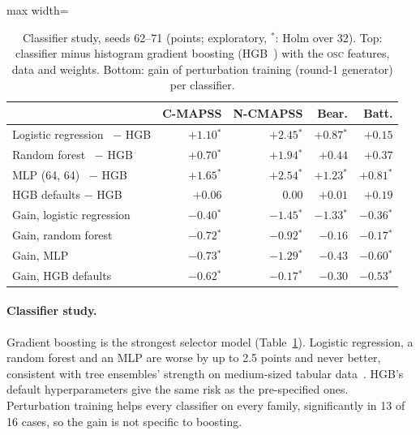 \documentclass{esannV2}
\newcommand{\OSC}{\textsc{osc}}
\newcommand{\s}{$^{\ast}$}
\begin{document}
\begin{table}[!htbp]
\caption{Classifier study, seeds 62--71 (points; exploratory, \s: Holm over 32). Top: classifier minus histogram gradient boosting (HGB~\cite{ke2017lightgbm,pedregosa2011scikit}) with the \OSC{} features, data and weights. Bottom: gain of perturbation training (round-1 generator) per classifier.}
\label{tab:clf}
\centering\footnotesize
\begin{adjustbox}{max width=\textwidth}\begin{tabular}{lrrrr}
\toprule
 & C-MAPSS & N-CMAPSS & Bear. & Batt.\\
\midrule
Logistic regression~\cite{cox1958regression} $-$ HGB & $+1.10$\s & $+2.45$\s & $+0.87$\s & $+0.15$\\
Random forest~\cite{breiman2001random} $-$ HGB & $+0.70$\s & $+1.94$\s & $+0.44$ & $+0.37$\\
MLP (64, 64)~\cite{rumelhart1986learning} $-$ HGB & $+1.65$\s & $+2.54$\s & $+1.23$\s & $+0.81$\s\\
HGB defaults $-$ HGB & $+0.06$ & $0.00$ & $+0.01$ & $+0.19$\\
\midrule
Gain, logistic regression~\cite{cox1958regression} & $-0.40$\s & $-1.45$\s & $-1.33$\s & $-0.36$\s\\
Gain, random forest~\cite{breiman2001random} & $-0.72$\s & $-0.92$\s & $-0.16$ & $-0.17$\s\\
Gain, MLP~\cite{rumelhart1986learning} & $-0.73$\s & $-1.29$\s & $-0.43$ & $-0.60$\s\\
Gain, HGB defaults & $-0.62$\s & $-0.17$\s & $-0.30$ & $-0.53$\s\\
\bottomrule
\end{tabular}\end{adjustbox}
\end{table}

\paragraph{Classifier study.}
Gradient boosting is the strongest selector model (Table~\ref{tab:clf}). Logistic regression, a random forest and an MLP are worse by up to 2.5 points and never better, consistent with tree ensembles' strength on medium-sized tabular data~\cite{grinsztajn2022tree}. HGB's default hyperparameters give the same risk as the pre-specified ones. Perturbation training helps every classifier on every family, significantly in 13 of 16 cases, so the gain is not specific to boosting.
\end{document}
